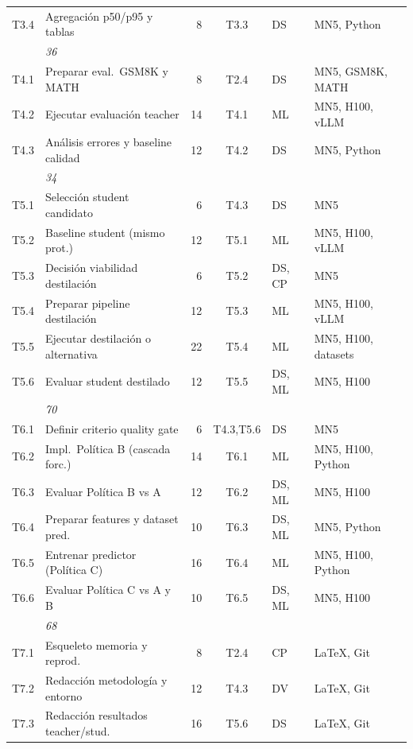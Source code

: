 {\begin{tabularx}{\textwidth}{>{\ttfamily}l >{\raggedright\arraybackslash}p{4.5cm} r c >{\raggedright\arraybackslash}p{1.1cm} >{\raggedright\arraybackslash}X}
T3.4 & Agregación p50/p95 y tablas & 8 & T3.3 & DS & MN5, Python \\
\multicolumn{2}{r}{\textit{Subtotal F3}} & \textit{36} & & & \\
\addlinespace[2pt]
T4.1 & Preparar eval.\ GSM8K y MATH & 8 & T2.4 & DS & MN5, GSM8K, MATH \\
T4.2 & Ejecutar evaluación teacher & 14 & T4.1 & ML & MN5, H100, vLLM \\
T4.3 & Análisis errores y baseline calidad & 12 & T4.2 & DS & MN5, Python \\
\multicolumn{2}{r}{\textit{Subtotal F4}} & \textit{34} & & & \\
\addlinespace[2pt]
T5.1 & Selección student candidato & 6 & T4.3 & DS & MN5 \\
T5.2 & Baseline student (mismo prot.) & 12 & T5.1 & ML & MN5, H100, vLLM \\
T5.3 & Decisión viabilidad destilación & 6 & T5.2 & DS, CP & MN5 \\
T5.4 & Preparar pipeline destilación & 12 & T5.3 & ML & MN5, H100, vLLM \\
T5.5 & Ejecutar destilación o alternativa & 22 & T5.4 & ML & MN5, H100, datasets \\
T5.6 & Evaluar student destilado & 12 & T5.5 & DS, ML & MN5, H100 \\
\multicolumn{2}{r}{\textit{Subtotal F5}} & \textit{70} & & & \\
\addlinespace[2pt]
T6.1 & Definir criterio quality gate & 6 & T4.3,T5.6 & DS & MN5 \\
T6.2 & Impl.\ Política B (cascada forc.) & 14 & T6.1 & ML & MN5, H100, Python \\
T6.3 & Evaluar Política B vs A & 12 & T6.2 & DS, ML & MN5, H100 \\
T6.4 & Preparar features y dataset pred. & 10 & T6.3 & DS, ML & MN5, Python \\
T6.5 & Entrenar predictor (Política C) & 16 & T6.4 & ML & MN5, H100, Python \\
T6.6 & Evaluar Política C vs A y B & 10 & T6.5 & DS, ML & MN5, H100 \\
\multicolumn{2}{r}{\textit{Subtotal F6}} & \textit{68} & & & \\
\addlinespace[2pt]
T7.1 & Esqueleto memoria y reprod. & 8 & T2.4 & CP & LaTeX, Git \\
T7.2 & Redacción metodología y entorno & 12 & T4.3 & DV & LaTeX, Git \\
T7.3 & Redacción resultados teacher/stud. & 16 & T5.6 & DS & LaTeX, Git \\

\end{tabularx}}
